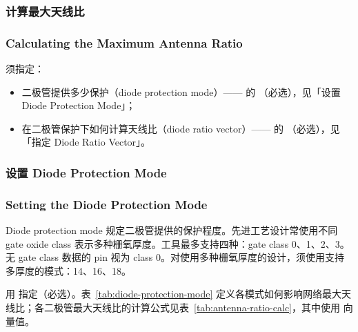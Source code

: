 \subsubsection{计算最大天线比}
\subsubsection*{Calculating the Maximum Antenna Ratio}

须指定：
\begin{itemize}
  \item 二极管提供多少保护（diode protection mode）—— 的 （必选），见「设置 Diode Protection Mode」；
  \item 在二极管保护下如何计算天线比（diode ratio vector）—— 的 （必选），见「指定 Diode Ratio Vector」。
\end{itemize}

\subsubsection{设置 Diode Protection Mode}
\subsubsection*{Setting the Diode Protection Mode}

Diode protection mode 规定二极管提供的保护程度。先进工艺设计常使用不同 gate oxide class 表示多种栅氧厚度。工具最多支持四种：gate class 0、1、2、3。无 gate class 数据的 pin 视为 class 0。对使用多种栅氧厚度的设计，须使用支持多厚度的模式：14、16、18。

用  指定（必选）。表~\ref{tab:diode-protection-mode} 定义各模式如何影响网络最大天线比；各二极管最大天线比的计算公式见表~\ref{tab:antenna-ratio-calc}，其中使用  向量值。


